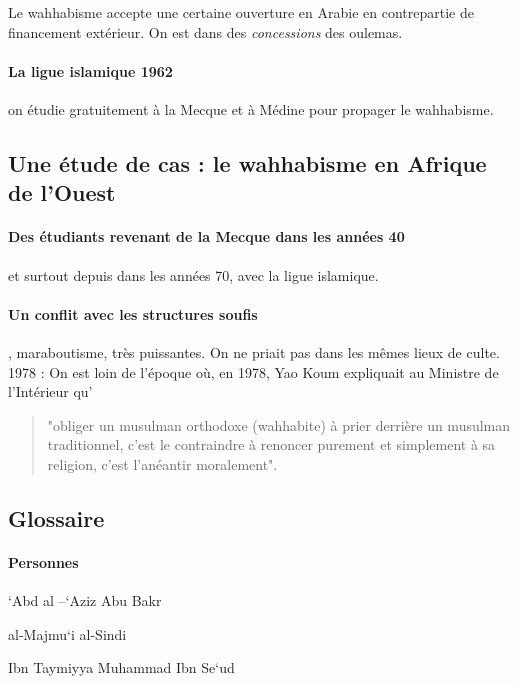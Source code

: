 Le wahhabisme accepte une certaine ouverture en Arabie en contrepartie de financement extérieur. On est dans des \textit{concessions} des oulemas. 

\paragraph{La ligue islamique 1962} on étudie gratuitement à la Mecque et à Médine pour propager le wahhabisme.

 
\subsection{Une étude de cas : le wahhabisme en Afrique de l’Ouest}

\paragraph{Des étudiants revenant de la Mecque dans les années 40} et surtout depuis dans les années 70, avec la ligue islamique. 

\paragraph{Un conflit avec les structures soufis}, maraboutisme, très puissantes. On ne priait pas dans les mêmes lieux de culte. 1978 : On  est  loin de  l'époque  où,  en  1978,  Yao  Koum  expliquait  au  Ministre  de  l'Intérieur  qu' 
\begin{quote}
    "obliger  un musulman  orthodoxe (wahhabite)  à  prier  derrière  un  musulman  traditionnel,  c'est  le  contraindre  à renoncer  purement  et  simplement  à  sa  religion,  c'est  l'anéantir  moralement".
\end{quote}


\subsection{ {Glossaire}} 


\paragraph{Personnes} `Abd al --`Aziz Abu Bakr

al-Majmu`i al-Sindi

Ibn Taymiyya Muhammad Ibn Se`ud


